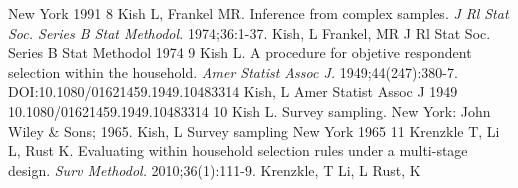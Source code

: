 \documentclass{article}
\begin{document}
New York%
1991%
8%
Kish L, Frankel MR. Inference from complex samples. %
\textit{J Rl Stat Soc. Series B Stat Methodol.}
1974;36:1-37.%
Kish, %
L
Frankel, %
MR
J Rl Stat Soc. Series B Stat Methodol%
1974%
9%
Kish L. A procedure for objetive respondent selection within the household. %
\textit{Amer Statist Assoc J.}
 1949;44(247):380-7. DOI:10.1080/01621459.1949.10483314%
Kish, %
L
Amer Statist Assoc J%
1949%
10.1080/01621459.1949.10483314%
10%
Kish L. Survey sampling. New York: John Wiley \& Sons; 1965.%
Kish, %
L
Survey sampling%
New York%
1965%
11%
Krenzkle T, Li L, Rust K. Evaluating within household selection rules under a multi-stage design. %
\textit{Surv Methodol.}
 2010;36(1):111-9.%
Krenzkle, %
T
Li, %
L
Rust, %
K
\end{document}

